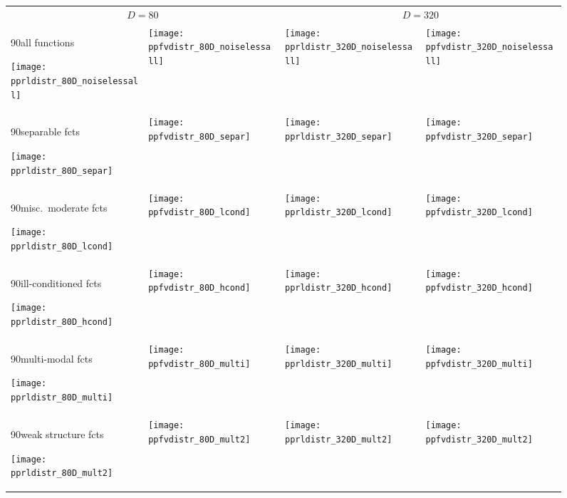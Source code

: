 \documentclass[sigconf]{acmart}
\newcommand{\rot}[2][2.5]{
  \hspace*{-3.5\baselineskip}%
  \begin{rotate}{90}\hspace{#1em}#2\vspace{0.5em}
  \end{rotate}}
\begin{document}
{%





\begin{figure*}
\begin{tabular}{l@{\hspace*{-0.00\textwidth}}l@{\hspace*{0.01\textwidth}}|l@{\hspace*{-0.00\textwidth}}l}
\multicolumn{2}{c}{$D=80$} & \multicolumn{2}{c}{$D=320$}\\[-0.5ex]
\rot[3]{all functions}
\texttt{[image: pprldistr\_80D\_noiselessall]} &
\texttt{[image: ppfvdistr\_80D\_noiselessall]} &
\texttt{[image: pprldistr\_320D\_noiselessall]} &
\texttt{[image: ppfvdistr\_320D\_noiselessall]} \\[-0.2em]
\rot[2.9]{separable fcts}
\texttt{[image: pprldistr\_80D\_separ]} &
\texttt{[image: ppfvdistr\_80D\_separ]} &
\texttt{[image: pprldistr\_320D\_separ]} &
\texttt{[image: ppfvdistr\_320D\_separ]} \\[-0.2em]
\rot[1.45]{misc.\ moderate fcts}
\texttt{[image: pprldistr\_80D\_lcond]} &
\texttt{[image: ppfvdistr\_80D\_lcond]} &
\texttt{[image: pprldistr\_320D\_lcond]} &
\texttt{[image: ppfvdistr\_320D\_lcond]} \\[-0.2em]
\rot[1.5]{ill-conditioned fcts}
\texttt{[image: pprldistr\_80D\_hcond]} &
\texttt{[image: ppfvdistr\_80D\_hcond]} &
\texttt{[image: pprldistr\_320D\_hcond]} &
\texttt{[image: ppfvdistr\_320D\_hcond]} \\[-0.2em]
\rot[2.3]{multi-modal fcts}
\texttt{[image: pprldistr\_80D\_multi]} &
\texttt{[image: ppfvdistr\_80D\_multi]} &
\texttt{[image: pprldistr\_320D\_multi]} &
\texttt{[image: ppfvdistr\_320D\_multi]} \\[-0.2em]
\rot[1.7]{weak structure fcts}
\texttt{[image: pprldistr\_80D\_mult2]} &
\texttt{[image: ppfvdistr\_80D\_mult2]} &
\texttt{[image: pprldistr\_320D\_mult2]} &
\texttt{[image: ppfvdistr\_320D\_mult2]}
\vspace*{-1ex}
\end{tabular}
 \caption{\label{fig:ECDFs}
 \bbobpprldistrlegend{}
 }
\end{figure*}

}
\end{document}
